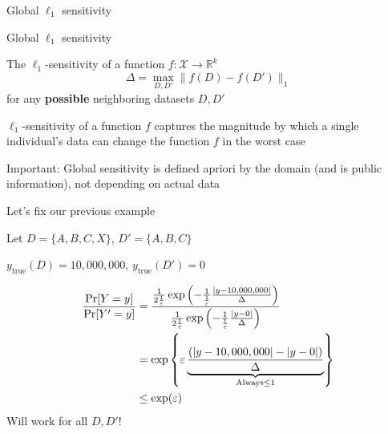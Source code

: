 \documentclass[12pt,aspectratio=169,handout]{beamer}
\begin{document}
\begin{frame}{Global $\ell_1$ sensitivity}

\begin{block}{Global $\ell_1$ sensitivity}

The $\ell_1$-sensitivity of a function $f : \mathcal{X} \rightarrow \mathbb{R}^k$
$$\Delta = \max_{D, D'} \| f(D) - f(D') \|_1$$
for any \textbf{possible} neighboring datasets $D, D'$
\end{block}

$\ell_1$-sensitivity of a function $f$ captures the magnitude by which a single individual’s data can change the function $f$ in the worst case

Important: Global sensitivity is defined apriori by the domain (and is public information), not depending on actual data



\end{frame}



\begin{frame}{Let's fix our previous example}

Let $D = \{A, B, C, X\}$, $D' = \{A, B, C\}$

$y_{\mathrm{true}}(D) = 10,000,000$, $y_{\mathrm{true}}(D') = 0$


$$
\begin{aligned}
\frac{\Pr[Y = y]}{\Pr[Y' = y]} &=
\frac{
\frac{1}{2\frac{1}{\varepsilon}} \exp \left(- \frac{1}{\frac{1}{\varepsilon}}
\frac{
\abs{y - 10,000,000}
}{\Delta}
\right)
}{
\frac{1}{2\frac{1}{\varepsilon}} \exp \left(- \frac{1}{\frac{1}{\varepsilon}}
\frac{
\abs{y - 0}
}{\Delta}
\right) 
} \\
&=
\exp \left\{ \varepsilon
\underbrace{
\frac{
\left( \abs{y - 10,000,000} - \abs{y - 0} \right)
}{\Delta}
}_{\text{Always} \leq 1}
\right\} \\
& \leq \exp(\varepsilon) \\
\end{aligned}
$$
Will work for all $D, D'$!
\end{frame}
\end{document}
